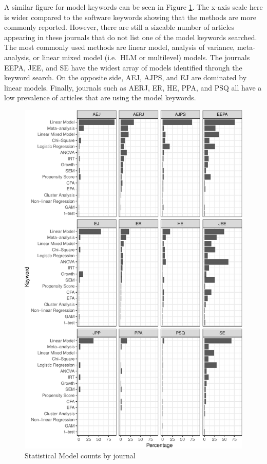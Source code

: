 \documentclass[english,,man]{apa6}
\theoremstyle{definition}
\theoremstyle{definition}
\theoremstyle{definition}
\theoremstyle{remark}
\begin{document}
A similar figure for model keywords can be seen in Figure
\ref{fig:model-journal}. The x-axis scale here is wider compared to the
software keywords showing that the methods are more commonly reported.
However, there are still a sizeable number of articles appearing in
these journals that do not list one of the model keywords searched. The
most commonly used methods are linear model, analysis of variance,
meta-analysis, or linear mixed model (i.e.~HLM or multilevel) models.
The journals EEPA, JEE, and SE have the widest array of models
identified through the keyword search. On the opposite side, AEJ, AJPS,
and EJ are dominated by linear models. Finally, journals such as AERJ,
ER, HE, PPA, and PSQ all have a low prevalence of articles that are
using the model keywords.

\begin{figure}
\centering
\includegraphics{software_files/figure-latex/model-journal-1.pdf}
\caption{\label{fig:model-journal}Statistical Model counts by journal}
\end{figure}
\end{document}
